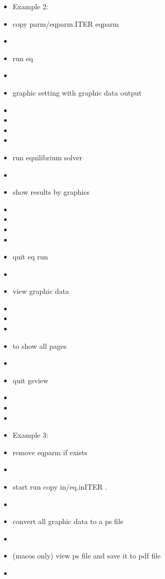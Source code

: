 \documentclass[11pt]{article}
\begin{document}
\begin{itemize}
\item[] Example 2:
\item[\quad] copy parm/eqparm.ITER eqparm
\item[\quad] 
\item[\quad] run eq
\item[\quad] 
\item[\quad] graphic setting with graphic data output
\item[\quad] 
\item[\quad] 
\item[\quad] 
\item[\quad] 
\item[\quad] run equilibrium solver
\item[\quad] 
\item[\quad] show results by graphics
\item[\quad] 
\item[\quad] 
\item[\quad] 
\item[\quad] 
\item[\quad] quit eq run
\item[\quad] 
\item[\quad] view graphic data
\item[\quad] 
\item[\quad] 
\item[\quad] 
\item[\quad] to show all pages
\item[\quad] 
\item[\quad] quit gsview
\item[\quad] 
\item[\quad]

\item[\quad]
\item[] Example 3:
\item[\quad] remove eqparm if exists
\item[\quad] 
\item[\quad] start run copy in/eq.inITER .
\item[\quad] 
\item[\quad] convert all graphic data to a ps file
\item[\quad] 
\item[\quad] (macos only) view ps file and save it to pdf file
\item[\quad] 
\end{itemize}
\end{document}

